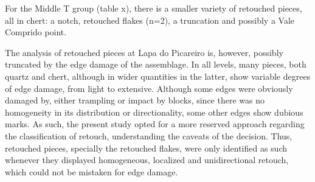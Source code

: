 \documentclass[12pt,twoside]{reedthesis}
\begin{document}
For the Middle T group (table x), there is a smaller variety of retouched pieces, all in chert: a notch, retouched flakes (n=2), a truncation and possibly a Vale Comprido point.
\begin{table}[!h]

\caption{\label{tab:retouchTG}U/Lower T retouched piece typology by raw material.}
\centering
{}
\end{table}
\begin{table}[!h]

\caption{\label{tab:retouchPR}Upper 5/4E Retouched piece typology by raw material.}
\centering
{}
\end{table}
The analysis of retouched pieces at Lapa do Picareiro is, however, possibly truncated by the edge damage of the assemblage. In all levels, many pieces, both quartz and chert, although in wider quantities in the latter, show variable degrees of edge damage, from light to extensive. Although some edges were obviously damaged by, either trampling or impact by blocks, since there was no homogeneity in its distribution or directionality, some other edges show dubious marks. As such, the present study opted for a more reserved approach regarding the classification of retouch, understanding the caveats of the decision. Thus, retouched pieces, specially the retouched flakes, were only identified as such whenever they displayed homogeneous, localized and unidirectional retouch, which could not be mistaken for edge damage.
\end{document}
